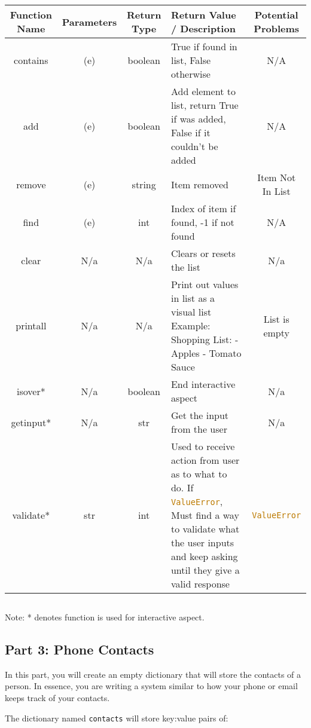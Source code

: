 \documentclass[12pt]{report}
\begin{document}
${}$

\begin{tabular}{| c | c | c | L | c |}
    \hline
    Function Name & Parameters & Return Type & Return Value / Description & Potential Problems \\
    \hline
    contains & (e) & boolean & True if found in list, False otherwise & N/A \\
    \hline
    add & (e) & boolean & Add element to list, return True if was added, False if it couldn't be added & N/A \\
    \hline
    remove & (e) & string & Item removed & Item Not In List \\
    \hline
    find & (e) & int & Index of item if found, -1 if not found & N/A \\
    \hline
    clear & N/a & N/a & Clears or resets the list & N/a \\
    \hline
    printall & N/a & N/a & Print out values in list as a visual list \newline Example: \newline Shopping List: \newline - Apples \newline - Tomato Sauce & List is empty \\
    \hline
    isover* & N/a & boolean & End interactive aspect & N/a \\
    \hline
    getinput* & N/a & str & Get the input from the user & N/a \\
    \hline
    validate* & str & int & Used to receive action from user as to what to do. If \lstinline[language=Python]!ValueError!,  Must find a way to validate what the user inputs and keep asking until they give a valid response & \lstinline[language=Python]!ValueError! \\
    \hline
\end{tabular}

${}$

Note: * denotes function is used for interactive aspect.

\newpage

\subsection*{Part 3: Phone Contacts}
In this part, you will create an empty dictionary that will store the contacts of a person. 
In essence, you are writing a system similar to how your phone or email keeps track of your contacts.

The dictionary named \lstinline[language=Python]{contacts} will store key:value pairs of: 
\end{document}

